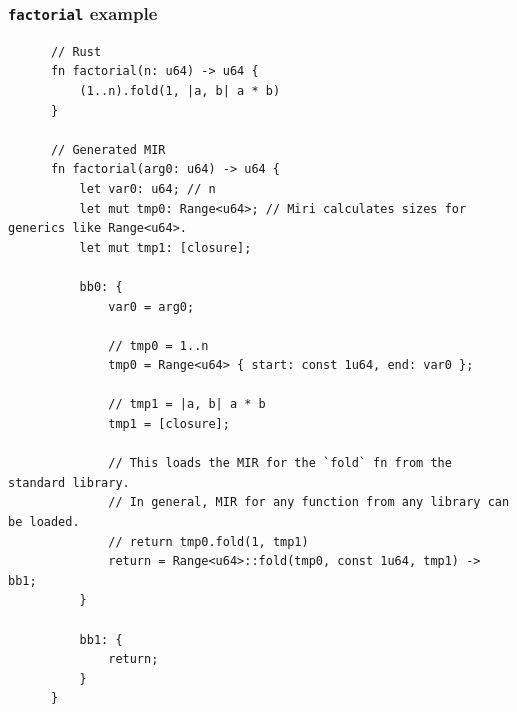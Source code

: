 \documentclass{beamer}
\begin{document}
\begin{frame}[fragile]
  \frametitle{\texttt{factorial} example}
  \begin{center}
    \begin{verbatim}
      // Rust
      fn factorial(n: u64) -> u64 {
          (1..n).fold(1, |a, b| a * b)
      }

      // Generated MIR
      fn factorial(arg0: u64) -> u64 {
          let var0: u64; // n
          let mut tmp0: Range<u64>; // Miri calculates sizes for generics like Range<u64>.
          let mut tmp1: [closure];

          bb0: {
              var0 = arg0;

              // tmp0 = 1..n
              tmp0 = Range<u64> { start: const 1u64, end: var0 };

              // tmp1 = |a, b| a * b
              tmp1 = [closure];

              // This loads the MIR for the `fold` fn from the standard library.
              // In general, MIR for any function from any library can be loaded.
              // return tmp0.fold(1, tmp1)
              return = Range<u64>::fold(tmp0, const 1u64, tmp1) -> bb1;
          }

          bb1: {
              return;
          }
      }
    \end{verbatim}
  \end{center}
\end{frame}
\end{document}
